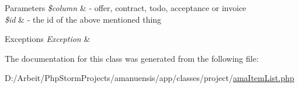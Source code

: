 \begin{DoxyParams}{Parameters}
{\em \$column} & -\/ offer, contract, todo, acceptance or invoice \\
\hline
{\em \$id} & -\/ the id of the above mentioned thing \\
\hline
\end{DoxyParams}

\begin{DoxyExceptions}{Exceptions}
{\em Exception} & \\
\hline
\end{DoxyExceptions}


The documentation for this class was generated from the following file\+:\begin{DoxyCompactItemize}
\item 
D\+:/\+Arbeit/\+Php\+Storm\+Projects/amanuensis/app/classes/project/\hyperlink{a00099}{ama\+Item\+List.\+php}\end{DoxyCompactItemize}
